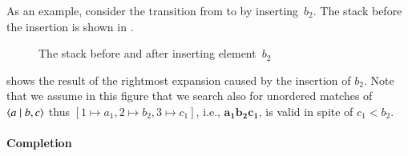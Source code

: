 As an example, consider the transition from  to
 by inserting~\(b_2\). The stack before the
insertion is shown in .
\begin{figure}
\centering
{}
\;
\caption{The stack before and after inserting element~\(b_2\)}
\end{figure}
 shows the result of the rightmost expansion
caused by the insertion of \(b_2\). Note that we assume in this figure
that we search also for unordered matches of \(\langle a \mid b,c\rangle\) thus
\([1 \mapsto a_1, 2 \mapsto b_2, 3 \mapsto c_1]\), i.e.,
\(\mathbf{a_1b_2c_1}\), is valid in spite of \(c_1 < b_2\).


\paragraph{Completion}

